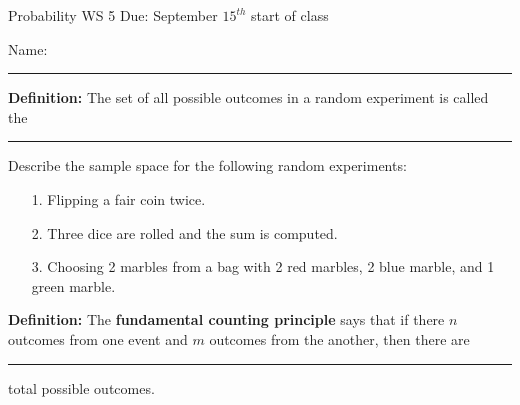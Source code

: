 \documentclass[oneside]{amsart}
\theoremstyle{definition}
\theoremstyle{definition}
\begin{document}
Probability \hfill {\huge WS 5} \hfill Due: September $15^{th}$ start of class \\
\begin{flushright}
    {\Large Name:}\rule[-1mm]{75mm}{.1mm}
\end{flushright}

 \hrulefill
\vspace{2mm}

\begin{ovalbox}{\begin{minipage}{6.8in}
\vspace{5mm}

\textbf{Definition:} The set of all possible outcomes in a random experiment is called the \\
\begin{center}
   \rule[-1mm]{85mm}{.1mm}
\end{center}


\vspace{7mm}

\end{minipage}}
\end{ovalbox}


\vspace{10mm}

Describe the sample space for the following random experiments:

\begin{itemize}
    \item[1.] Flipping a fair coin twice.

    \vfill

    \item[2.] Three dice are rolled and the sum is computed.
    \vfill

    \item[3.] Choosing 2 marbles from a bag with 2 red marbles, 2 blue marble, and 1 green marble.

    \vfill
    
\end{itemize}

\begin{ovalbox}{\begin{minipage}{6.8in}
\vspace{5mm}

\textbf{Definition:} The \textbf{fundamental counting principle} says that if there $n$ outcomes from one event and $m$ outcomes from the another, then there are   \\
\begin{center}
   \rule[-1mm]{85mm}{.1mm}
\end{center}
total possible outcomes.

\vspace{7mm}

\end{minipage}}
\end{ovalbox}
\end{document}
